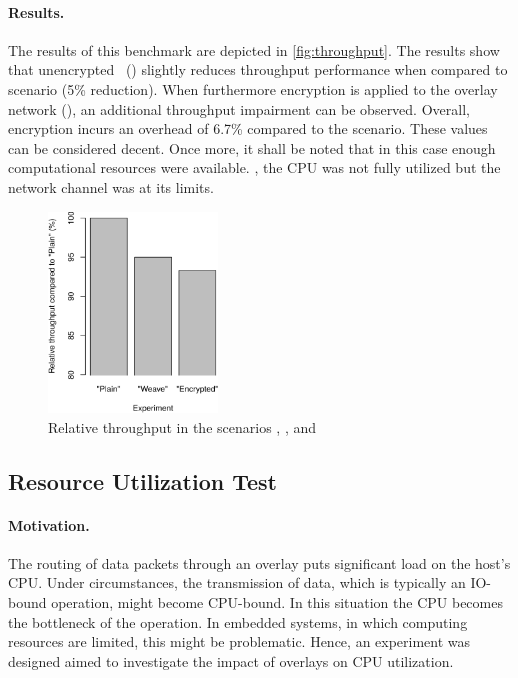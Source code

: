 \paragraph{Results.}
The results of this benchmark are depicted in \autoref{fig:throughput}. The results show that unencrypted \wnet\ () slightly reduces throughput performance when compared to  scenario (5\% reduction). When furthermore encryption is applied to the overlay network (), an additional throughput impairment can be observed. Overall, encryption incurs an overhead of 6.7\% compared to the  scenario. These values can be considered decent. Once more, it shall be noted that in this case enough computational resources were available. \Ie , the CPU was not fully utilized but the network channel was at its limits.
\begin{figure}[htpb]
  \centering
  \includegraphics[width=0.4\textwidth]{figures/throughput}
  \caption[\weave\ throughput benchmark results]{Relative throughput in the scenarios , , and }\label{fig:throughput}
\end{figure} 
%
%
%
%
%
%
%
%
%
%
\subsection{Resource Utilization Test} \label{sec:utilization}
\paragraph{Motivation.} The routing of data packets through an overlay puts significant load on the host's CPU. Under circumstances, the transmission of data, which is typically an IO-bound operation, might become CPU-bound. In this situation the CPU becomes the bottleneck of the operation. In embedded systems, in which computing resources are limited, this might be problematic. Hence, an experiment was designed aimed to investigate the impact of overlays on CPU utilization.

